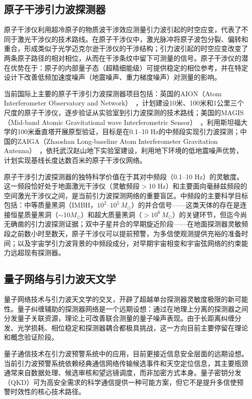 \subsection{原子干涉引力波探测器}

原子干涉仪利用超冷原子的物质波干涉效应测量引力波引起的时空应变，代表了不同于激光干涉仪的技术路线。在原子干涉仪中，激光脉冲将原子波包分裂、偏转和重合，形成类似于光学迈克尔逊干涉仪的干涉结构；引力波引起的时空应变改变了两条原子路径的相对相位，从而在干涉条纹中留下可测量的信号。原子干涉仪的潜在优势在于：原子的内部量子态（超精细能级）可提供稳定的相位参考，并在特定设计下改善低频加速度噪声（地震噪声、重力梯度噪声）对测量的影响。

当前国际上主要的原子干涉引力波探测器项目包括：英国的AION（Atom Interferometer Observatory and Network）~\cite{Badurina2020AION}，计划建设10米、100米和1公里三个尺度的原子干涉仪，逐步验证从实验室到引力波探测的技术路线；美国的MAGIS（Mid-band Atomic Gravitational wave Interferometric Sensor）~\cite{Graham2017MAGIS}，利用斯坦福大学的100米垂直塔开展原型验证，目标是在0.1--10 Hz的中频段实现引力波探测；中国的ZAIGA（Zhaoshan Long-baseline Atom Interferometer Gravitation Antenna）~\cite{Zhan2020ZAIGA}，依托武汉赵山地下实验室建设，利用地下环境的低地震噪声优势，计划实现基线长度达数百米的原子干涉仪网络。

原子干涉引力波探测器的独特科学价值在于其对中频段（0.1--10 Hz）的灵敏度。这一频段恰好处于地面激光干涉仪（灵敏频段$>$10 Hz）和主要面向毫赫兹频段的空间激光干涉仪之间，是当前引力波探测网络的重要盲区。中频段的主要科学目标包括：中等质量黑洞（IMBH，$10^2$--$10^5\,M_\odot$）的并合信号——这类天体的存在是连接恒星质量黑洞（$\sim$10$M_\odot$）和超大质量黑洞（$>10^6\,M_\odot$）的关键环节，但迄今尚无确凿的引力波探测证据；双中子星并合的早期旋近阶段——在地面探测器灵敏频段之前数小时至数天，原子干涉仪可以提前预警，为多信使观测提供充裕的准备时间；以及宇宙学引力波背景的中频段成分，对早期宇宙相变和宇宙弦网络的约束能力远超现有探测器。

\subsection{量子网络与引力波天文学}

量子网络技术与引力波天文学的交叉，开辟了超越单台探测器灵敏度极限的新可能性。量子纠缠辅助的探测器网络是一个远期设想：通过在地理上分离的探测器之间分发量子关联资源，理论上可改善联合测量的量子噪声表现。由于长距离纠缠分发、光学损耗、相位稳定和探测器耦合都极具挑战，这一方向目前主要停留在理论和概念验证阶段。

量子通信技术在引力波预警系统中的应用，目前更接近信息安全层面的远期设想。当前引力波预警系统依赖经典通信网络传输候选事件和天空定位信息，其主要瓶颈通常来自数据处理、候选审核和望远镜调度，而非加密方式本身。量子密钥分发（QKD）可为高安全需求的科学通信提供一种可能方案，但它不是提升多信使预警时效性的核心技术路径。


